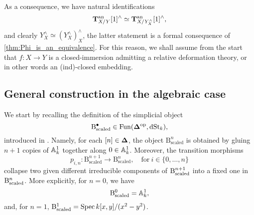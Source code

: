 \documentclass[10pt,a4paper,reqno]{amsart} %
\theoremstyle{plain}
\theoremstyle{definition}
\theoremstyle{remark}
\numberwithin{equation}{section}
\begin{document}
As a consequence, we have natural identifications
    \[
        \mathbf T^\mathrm{an}_{X/ Y}[1]^\wedge \simeq \mathbf T^\mathrm{an}_{X/ Y^\wedge_X}[1]^\wedge,  
    \]
and clearly $Y^\wedge_X \simeq (Y^\wedge_X)^\wedge_X$, the latter statement is a formal consequence of \cref{thm:Phi_is_an_equivalence}.
For this reason, we shall assume from the start that $f \colon X \to Y$ is a closed-immersion admitting a relative deformation theory, or in other
words an (ind)-closed embedding.

\subsection{General construction in the algebraic case} We start by recalling the definition of the simplicial object
    \[
        \mathrm{B}^\bullet_{\mathrm{scaled}} \in \operatorname{Fun}(\bm{\Delta} ^\mathrm{op}, \mathrm{dSt}_k),
    \]
introduced in
\cite[\S 9.2.2]{Gaitsgory_Study_II}. Namely, for each $[n] \in \bm{\Delta}$, the object $\mathrm{B}^{n}_\mathrm{scaled}$ is obtained by gluing $n+1$ copies of $\mathbb A^1_k$ together along
$0 \in \mathbb A^1_k$. Moreover, the transition morphisms
    \[
        p_{i, n} \colon  \mathrm{B}^{n+1}_\mathrm{scaled} \to \mathrm{B}^n_{\mathrm{scaled}}, \quad \mathrm{for} \ i \in \{0, \dots, n\} 
    \]
collapse two given different irreducible components of $\mathrm B^{n+1}_\mathrm{scaled}$ into a fixed one in $\mathrm B^n_{\mathrm{scaled}}$. More explicitly, for $n=0$, we have
    \[
        \mathrm B_\mathrm{scaled}^0 = \mathbb A^1_k,  
    \]
and, for $n = 1$, $\mathrm B_\mathrm{scaled}^1 = \operatorname{Spec} k[x, y]/ (x^2 - y^2)$.
\end{document}
